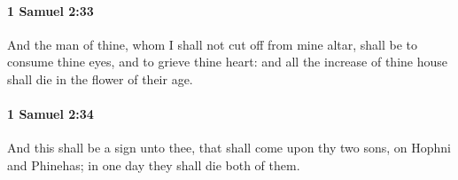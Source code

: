 		\paragraph{1 Samuel 2:33} %
			\label{1SAMUEL-2-33}

			And the man of thine, whom I shall not cut off from mine altar, shall be to consume thine eyes, and to grieve thine heart: and all the increase of thine house shall die in the flower of their age.


		\paragraph{1 Samuel 2:34} %
			\label{1SAMUEL-2-34}

			And this shall be a sign unto thee, that shall come upon thy two sons, on Hophni and Phinehas; in one day they shall die both of them.


